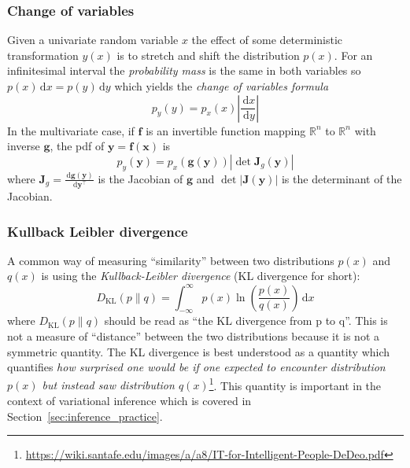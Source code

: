\documentclass[12pt,dvipsnames]{report}
\newcommand{\ud}{\,\mathrm{d}}
\renewcommand{\vec}[1]{\boldsymbol{\mathbf{#1}}}
\begin{document}
\subsubsection{Change of variables}
Given a univariate random variable $x$ the effect of some deterministic
transformation $y(x)$ is to stretch and shift the distribution $p(x)$. For an
infinitesimal interval the \emph{probability mass} is the same in both
variables so $p(x) \ud x=p(y) \ud y$ which yields the \emph{change of variables
    formula}
\begin{equation}
    p_{y}(y)=p_{x}(x)\left|\frac{\ud x}{\ud y}\right|
\end{equation}
In the multivariate case, if $\vec{f}$ is an invertible function mapping $\mathbb{R}^n$
to $\mathbb{R}^n$ with inverse $\vec{g}$, the pdf of $\vec{y}=\vec{f}(\vec{x})$ is
\citep{murphy_book_2022}
\begin{equation}
    p_{y}(\vec{y})=p_{x}(\vec{g}(\vec{y}))\left|\operatorname{det}\mathbf{J}_{g}(\vec{y})\right|
\end{equation}
where $\vec{J}_{g}=\frac{\ud \vec{g}(\vec{y})}{\ud \vec{y}^{\intercal}}$ is the Jacobian of $\vec{g}$
and $\operatorname{det}|\mathbf{J}(\vec{y})|$ is the determinant of the Jacobian.

\subsubsection{Kullback Leibler divergence}
A common way of measuring ``similarity'' between two distributions $p(x)$ and
$q(x)$ is using the \emph{Kullback-Leibler divergence} (KL divergence for
short):
\begin{equation}
    D_{\mathrm{KL}}(p \| q)=\int_{-\infty}^{\infty} p(x) \ln \left(\frac{p(x)}{q(x)}\right) \ud x
    \label{eq:kl_divergence}
\end{equation}
where $D_{\mathrm{KL}}(p \| q)$ should be read as ``the KL divergence from p to q''.
This is not a measure of ``distance'' between the two distributions because
it is not a symmetric quantity. The KL divergence is best understood as a quantity which
quantifies \emph{how surprised one would be if one expected to encounter distribution $p(x)$
    but instead saw distribution
    $q(x)$}\footnote{\url{https://wiki.santafe.edu/images/a/a8/IT-for-Intelligent-People-DeDeo.pdf}}.
This quantity is important in the context of variational inference which is covered in
Section~\ref{sec:inference_practice}.
\end{document}
